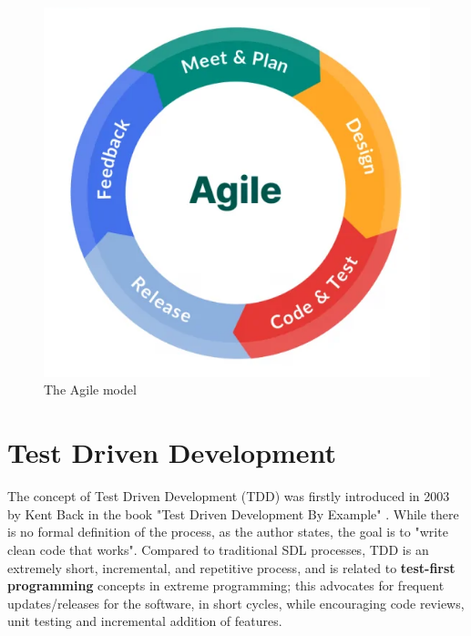 \begin{figure}[h]
    \centering
    \includegraphics[width=\linewidth]{figures/agile_model.jpg}
    \caption{The Agile model}
    \label{agile_model}
\end{figure}



\section{Test Driven Development}
The concept of Test Driven Development (TDD) was firstly introduced in 2003 by Kent Back in the book "Test Driven Development By Example" \cite{TDDByExample}. While there is no formal definition of the process, as the author states, the goal is to "write clean code that works".
Compared to traditional SDL processes, TDD is an extremely short, incremental, and repetitive process, and is related to \textbf{test-first programming} concepts in extreme programming; this advocates for frequent updates/releases for the software, in short cycles, while encouraging code reviews, unit testing and incremental addition of features.


